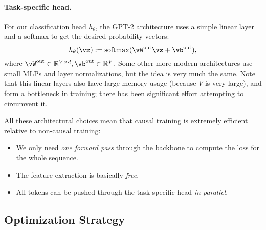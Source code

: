 \documentclass[\toplevelprefix/book-main.tex]{subfiles}
\begin{document}
\paragraph{Task-specific head.} For our classification head \(h_{\theta}\), the GPT-2 architecture uses a simple linear layer and a softmax to get the desired probability vectors:
\begin{equation}
    h_{\theta}(\vz) := \softmax(\vW^{\out}\vz + \vb^{\out}),
\end{equation}
where \(\vW^{\out} \in \R^{V \times d}, \vb^{\out} \in \R^{V}\). Some other more modern architectures use small MLPs and layer normalizations, but the idea is very much the same. Note that this linear layers also have large memory usage (because \(V\) is very large), and form a bottleneck in training; there has been significant effort attempting to circumvent it.

All these architectural choices mean that causal training is extremely efficient relative to non-causal training:
\begin{itemize}
    \item We only need \textit{one forward pass} through the backbone to compute the loss for the whole sequence.
    \item The feature extraction is basically \textit{free}.
    \item All tokens can be pushed through the task-specific head \textit{in parallel}.
\end{itemize}

\subsection{Optimization Strategy}
\end{document}
